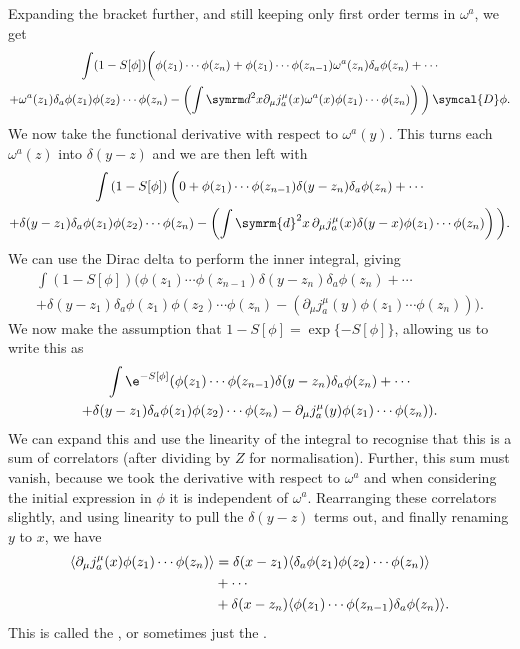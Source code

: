 \documentclass[fleqn]{NotesClass}
\renewcommand{\dl}[1]{\symrm{d}#1}
\newcommand{\DD}{\,\symcal{D}}
\DeclarePairedDelimiter{\correlator}{\langle}{\rangle}
\begin{document}
    Expanding the bracket further, and still keeping only first order terms in \(\omega^a\), we get
    \begin{multline*}
        \int (1 - S[\phi])\bigg( \phi(z_1) \dotsm \phi(z_n) + \phi(z_1) \dotsm \phi(z_{n-1}) \omega^a(z_n)\delta_a\phi(z_n) + \dotsb\\
         + \omega^a(z_1)\delta_a\phi(z_1)\phi(z_2) \dotsm \phi(z_n) - \left( \int \dl^2x \partial_\mu j^\mu_a(x)\omega^a(x) \phi(z_1) \dotsm \phi(z_n)  \right) \bigg) \DD\phi.
    \end{multline*}
    We now take the functional derivative with respect to \(\omega^a(y)\).
    This turns each \(\omega^a(z)\) into \(\delta(y - z)\) and we are then left with
    \begin{multline*}
        \int\left( 1 - S[\phi] \right) \bigg( 0 + \phi(z_1) \dotsm \phi(z_{n-1}) \delta(y - z_n)\delta_a\phi(z_n) + \dotsb\\
        + \delta(y - z_1)\delta_a\phi(z_1)\phi(z_2) \dotsm \phi(z_n) - \left( \int \dl{^2x} \, \partial_\mu j^\mu_a(x) \delta(y - x) \phi(z_1) \dotsm \phi(z_n) \right)\bigg).
    \end{multline*}
    We can use the Dirac delta to perform the inner integral, giving
    \begin{multline*}
        \int\left( 1 - S[\phi] \right) \bigg( \phi(z_1) \dotsm \phi(z_{n-1}) \delta(y - z_n)\delta_a\phi(z_n) + \dotsb\\
        + \delta(y - z_1)\delta_a\phi(z_1)\phi(z_2) \dotsm \phi(z_n) - \left( \partial_\mu j^\mu_a(y)\phi(z_1) \dotsm \phi(z_n) \right)\bigg).
    \end{multline*}
    We now make the assumption that \(1 - S[\phi] = \exp\{-S[\phi]\}\), allowing us to write this as
    \begin{multline*}
        \int \e^{-S[\phi]} ( \phi(z_1) \dotsm \phi(z_{n-1}) \delta(y - z_n)\delta_a\phi(z_n) + \dotsb\\
        + \delta(y - z_1)\delta_a\phi(z_1) \phi(z_2) \dotsm \phi(z_n) - \partial_\mu j^\mu_a(y) \phi(z_1) \dotsm \phi(z_n) ).
    \end{multline*}
    We can expand this and use the linearity of the integral to recognise that this is a sum of correlators (after dividing by \(Z\) for normalisation).
    Further, this sum must vanish, because we took the derivative with respect to \(\omega^a\) and when considering the initial expression in \(\phi\) it is independent of \(\omega^a\).
    Rearranging these correlators slightly, and using linearity to pull the \(\delta(y - z)\) terms out, and finally renaming \(y\) to \(x\), we have
    \begin{align}
        \correlator{\partial_\mu j^\mu_a(x) \phi(z_1) \dotsm \phi(z_n)} &= \delta(x - z_1) \correlator{\delta_a\phi(z_1)\phi(z_2) \dotsm \phi(z_n)}\\
        &+ \dotsb \notag\\
        &+ \delta(x - z_n)\correlator{\phi(z_1) \dotsm \phi(z_{n-1}) \delta_a\phi(z_n)}. \notag
    \end{align}
    This is called the , or sometimes just the .
    
\end{document}
